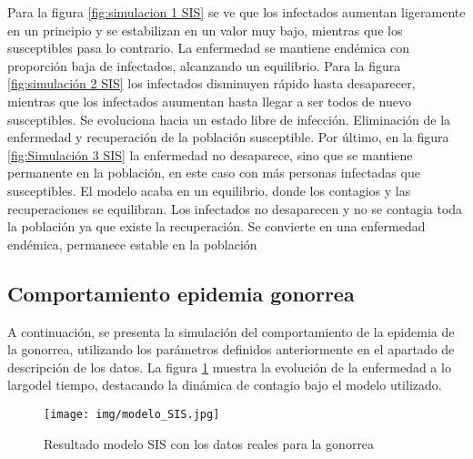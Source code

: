 Para la figura \ref{fig:simulacion 1 SIS} se ve que los infectados aumentan ligeramente en un principio y se estabilizan en un valor muy bajo, mientras que los susceptibles pasa lo contrario. La enfermedad se mantiene endémica con proporción baja de infectados, alcanzando un equilibrio.
Para la figura \ref{fig:simulación 2 SIS} los infectados disminuyen rápido hasta desaparecer, mientras que los infectados auumentan hasta llegar a ser todos de nuevo susceptibles. Se evoluciona hacia un estado libre de infección. Eliminación de la enfermedad y recuperación de la población susceptible. Por último, en la figura \ref{fig:Simulación 3 SIS} la enfermedad no desaparece, sino que se mantiene permanente en la población, en este caso con más personas infectadas que susceptibles. El modelo acaba en un equilibrio, donde los contagios y las recuperaciones se equilibran. Los infectados no desaparecen y no se contagia toda la población ya que existe la recuperación. Se convierte en una enfermedad endémica, permanece estable en la población

\subsection{Comportamiento epidemia gonorrea}
A continuación, se presenta  la simulación del comportamiento de la epidemia de la gonorrea, utilizando los parámetros definidos anteriormente en el apartado de descripción de los datos. La figura \ref{fig:simugono} muestra la evolución de la enfermedad a lo largodel tiempo, destacando la dinámica de contagio bajo el modelo utilizado.

\begin{figure}[H]
    \centering
    \texttt{[image: img/modelo\_SIS.jpg]}
    \caption{Resultado modelo SIS con los datos reales para la gonorrea}
    \label{fig:simugono}
    \vspace{0.5cm} %
\end{figure}

